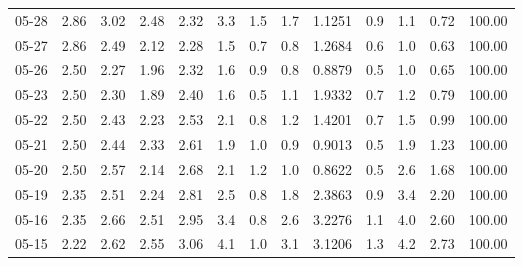 \begin{threeparttable}
{\begin{tabular}{lrrrrrrrrrrrr}
  05-28 &          2.86 &          3.02 &          2.48 &        2.32 &                 3.3 &                 1.5 &        1.7 &       1.1251 &                 0.9 &              1.1 &            0.72 &                 100.00 \\
  05-27 &          2.86 &          2.49 &          2.12 &        2.28 &                 1.5 &                 0.7 &        0.8 &       1.2684 &                 0.6 &              1.0 &            0.63 &                 100.00 \\
  05-26 &          2.50 &          2.27 &          1.96 &        2.32 &                 1.6 &                 0.9 &        0.8 &       0.8879 &                 0.5 &              1.0 &            0.65 &                 100.00 \\
  05-23 &          2.50 &          2.30 &          1.89 &        2.40 &                 1.6 &                 0.5 &        1.1 &       1.9332 &                 0.7 &              1.2 &            0.79 &                 100.00 \\
  05-22 &          2.50 &          2.43 &          2.23 &        2.53 &                 2.1 &                 0.8 &        1.2 &       1.4201 &                 0.7 &              1.5 &            0.99 &                 100.00 \\
  05-21 &          2.50 &          2.44 &          2.33 &        2.61 &                 1.9 &                 1.0 &        0.9 &       0.9013 &                 0.5 &              1.9 &            1.23 &                 100.00 \\
  05-20 &          2.50 &          2.57 &          2.14 &        2.68 &                 2.1 &                 1.2 &        1.0 &       0.8622 &                 0.5 &              2.6 &            1.68 &                 100.00 \\
  05-19 &          2.35 &          2.51 &          2.24 &        2.81 &                 2.5 &                 0.8 &        1.8 &       2.3863 &                 0.9 &              3.4 &            2.20 &                 100.00 \\
  05-16 &          2.35 &          2.66 &          2.51 &        2.95 &                 3.4 &                 0.8 &        2.6 &       3.2276 &                 1.1 &              4.0 &            2.60 &                 100.00 \\
  05-15 &          2.22 &          2.62 &          2.55 &        3.06 &                 4.1 &                 1.0 &        3.1 &       3.1206 &                 1.3 &              4.2 &            2.73 &                 100.00 \\

\end{tabular}}
\end{threeparttable}
